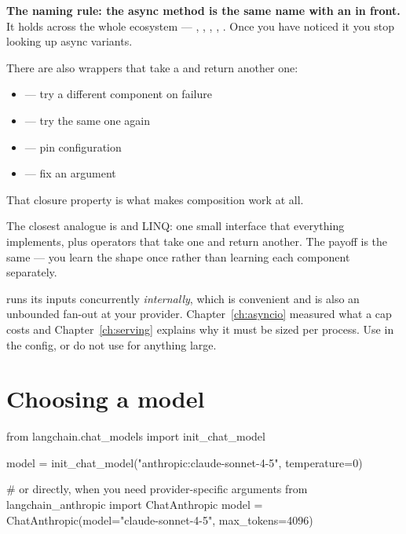 \textbf{The naming rule: the async method is the same name with an  in
front.} It holds across the whole ecosystem --- ,
, , , . Once you have
noticed it you stop looking up async variants.

There are also wrappers that take a  and return another one:

\begin{itemize}[leftmargin=1.4em,nosep]
\item {} --- try a different component on failure
\item {} --- try the same one again
\item {} --- pin configuration
\item {} --- fix an argument
\end{itemize}

\medskip
\noindent
That closure property is what makes composition work at all.

\begin{dotnetbox}
The closest analogue is  and LINQ: one small interface that
everything implements, plus operators that take one and return another. The
payoff is the same --- you learn the shape once rather than learning each
component separately.
\end{dotnetbox}

\begin{warning}
 runs its inputs concurrently \emph{internally}, which is convenient
and is also an unbounded fan-out at your provider. Chapter~\ref{ch:asyncio}
measured what a cap costs and Chapter~\ref{ch:serving} explains why it must be
sized per process. Use  in the config, or do not use
 for anything large.
\end{warning}

\section{Choosing a model}
\label{sec:init-chat-model}

\begin{python}[caption={Two ways to name a model}, label={lst:init-model}]
from langchain.chat_models import init_chat_model

model = init_chat_model("anthropic:claude-sonnet-4-5", temperature=0)

# or directly, when you need provider-specific arguments
from langchain_anthropic import ChatAnthropic
model = ChatAnthropic(model="claude-sonnet-4-5", max_tokens=4096)
\end{python}

